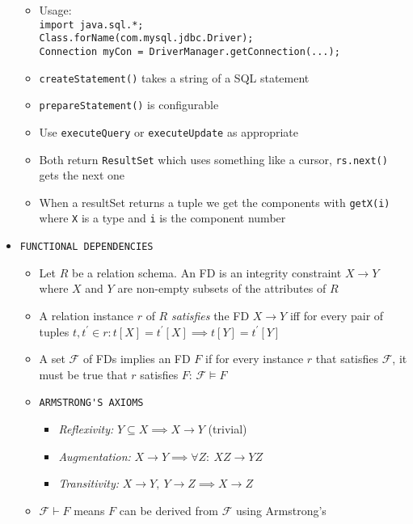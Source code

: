 \documentclass[landscape,8pt]{extarticle}
\newcommand{\code}{\lstinline}
\begin{document}
\begin{multicols}{4}
\begin{itemize}
\begin{itemize}
        \item Usage:\\
\code{import java.sql.*;}\\
\code{Class.forName(com.mysql.jdbc.Driver);}\\
\code{Connection myCon = DriverManager.getConnection(...);}
        \item \code{createStatement()} takes a string of a SQL statement
        \item \code{prepareStatement()} is configurable
        \item Use \code{executeQuery} or \code{executeUpdate} as appropriate
        \item Both return \code{ResultSet} which uses something like a cursor, \code{rs.next()} gets
        the next one
        \item When a resultSet returns a tuple we get the components with \code{getX(i)} where
        \code{X} is a type and \code{i} is the component number
    \end{itemize}
    \item \code{FUNCTIONAL DEPENDENCIES}
    \begin{itemize}
        \item Let $R$ be a relation schema. An FD is an integrity constraint $X \rightarrow Y$ where
        $X$ and $Y$ are non-empty subsets of the attributes of $R$
        \item A relation instance $r$ of $R$ \emph{satisfies} the FD $X \rightarrow Y$ iff for every
        pair of tuples $t, t^\prime \in r: t[X] = t^\prime[X] \implies t[Y] = t^\prime[Y]$
        \item A set $\mathcal{F}$ of FDs implies an FD $F$ if for every instance $r$ that satisfies
        $\mathcal{F}$, it must be true that $r$ satisfies $F$: $\mathcal{F} \models F$
        \item \code{ARMSTRONG'S AXIOMS}
        \begin{itemize}
            \item \emph{Reflexivity:} $Y \subseteq X \implies X \rightarrow Y$ (trivial)
            \item \emph{Augmentation:} $X \rightarrow Y \implies \forall Z:\ XZ \rightarrow YZ$
            \item \emph{Transitivity:} $X \rightarrow Y,\ Y \rightarrow Z \implies X \rightarrow Z$
        \end{itemize}
        \item $\mathcal{F} \vdash F$ means $F$ can be derived from $\mathcal{F}$ using Armstrong's

\end{itemize}
\end{itemize}
\end{multicols}
\end{document}
